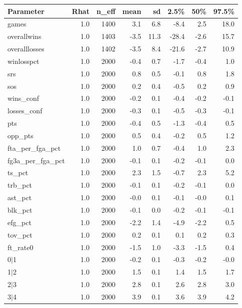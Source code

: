 \documentclass[10pt,a4paper, hidelinks]{article} %
\begin{document}
\begin{table}[ht]
	\centering
	\begin{tabular}{lrrrrrrr}
		\toprule
		Parameter & Rhat & n\_eff & mean & sd & 2.5\% & 50\% & 97.5\% \\ 
		\midrule
		games & 1.0 & 1400 & 3.1 & 6.8 & -8.4 & 2.5 & 18.0 \\ 
		overallwins & 1.0 & 1403 & -3.5 & 11.3 & -28.4 & -2.6 & 15.7 \\ 
		overalllosses & 1.0 & 1402 & -3.5 & 8.4 & -21.6 & -2.7 & 10.9 \\ 
		winlosspct & 1.0 & 2000 & -0.4 & 0.7 & -1.7 & -0.4 & 1.0 \\ 
		srs & 1.0 & 2000 & 0.8 & 0.5 & -0.1 & 0.8 & 1.8 \\ 
		sos & 1.0 & 2000 & 0.2 & 0.4 & -0.5 & 0.2 & 0.9 \\ 
		wins\_conf & 1.0 & 2000 & -0.2 & 0.1 & -0.4 & -0.2 & -0.1 \\ 
		losses\_conf & 1.0 & 2000 & -0.3 & 0.1 & -0.5 & -0.3 & -0.1 \\ 
		pts & 1.0 & 2000 & -0.4 & 0.5 & -1.3 & -0.4 & 0.5 \\ 
		opp\_pts & 1.0 & 2000 & 0.5 & 0.4 & -0.2 & 0.5 & 1.2 \\ 
		fta\_per\_fga\_pct & 1.0 & 2000 & 1.0 & 0.7 & -0.4 & 1.0 & 2.3 \\ 
		fg3a\_per\_fga\_pct & 1.0 & 2000 & -0.1 & 0.1 & -0.2 & -0.1 & 0.0 \\ 
		ts\_pct & 1.0 & 2000 & 2.3 & 1.5 & -0.7 & 2.3 & 5.2 \\ 
		trb\_pct & 1.0 & 2000 & -0.1 & 0.1 & -0.2 & -0.1 & 0.0 \\ 
		ast\_pct & 1.0 & 2000 & -0.0 & 0.1 & -0.1 & -0.0 & 0.1 \\ 
		blk\_pct & 1.0 & 2000 & -0.1 & 0.0 & -0.2 & -0.1 & -0.1 \\ 
		efg\_pct & 1.0 & 2000 & -2.2 & 1.4 & -4.9 & -2.2 & 0.5 \\ 
		tov\_pct & 1.0 & 2000 & 0.2 & 0.1 & 0.1 & 0.2 & 0.3 \\ 
		ft\_rate0 & 1.0 & 2000 & -1.5 & 1.0 & -3.3 & -1.5 & 0.4 \\ 
		0$|$1 & 1.0 & 2000 & -0.2 & 0.1 & -0.3 & -0.2 & -0.0 \\ 
		1$|$2 & 1.0 & 2000 & 1.5 & 0.1 & 1.4 & 1.5 & 1.7 \\ 
		2$|$3 & 1.0 & 2000 & 2.8 & 0.1 & 2.6 & 2.8 & 3.0 \\ 
		3$|$4 & 1.0 & 2000 & 3.9 & 0.1 & 3.6 & 3.9 & 4.2 \\ 

\end{tabular}
\end{table}
\end{document}

